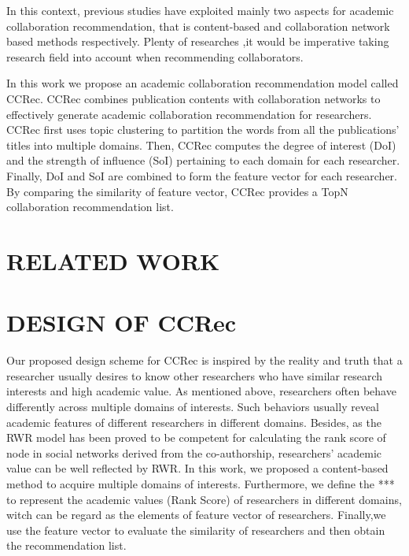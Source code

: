 \documentclass{acm_proc_article-sp}
\begin{document}
In this context, previous studies have exploited mainly two aspects for academic collaboration recommendation, that is content-based and collaboration network based methods respectively. Plenty of researches ,it would be imperative taking research field into account when recommending collaborators.

In this work we propose an academic collaboration recommendation model called CCRec. CCRec combines publication contents with collaboration networks to effectively generate academic collaboration recommendation for researchers. CCRec first uses topic clustering to partition the words from all the publications' titles into multiple domains. Then, CCRec computes the degree of interest (DoI) and the strength of influence (SoI) pertaining to each domain for each researcher. Finally, DoI and SoI are combined to form the feature vector for each researcher. By comparing the similarity of feature vector, CCRec provides a TopN collaboration recommendation list.

\section{RELATED WORK}


\section{DESIGN OF CCRec}
Our proposed design scheme for CCRec is inspired by the reality and truth that a researcher usually desires to know other researchers who have similar research interests and high academic value. As mentioned above, researchers often behave differently across multiple domains of interests. Such behaviors usually reveal academic features of different researchers in different domains. Besides, as the RWR model has been proved to be competent for calculating the rank score of node in social networks derived from the co-authorship, researchers' academic value can be well reflected by RWR. In this work, we proposed a content-based method to acquire multiple domains of interests. Furthermore, we define the *** to represent the academic values (Rank Score) of researchers in different domains, witch can be regard as the elements of feature vector of researchers. Finally,we use the feature vector to evaluate the similarity of researchers and then obtain the recommendation list.
\end{document}
